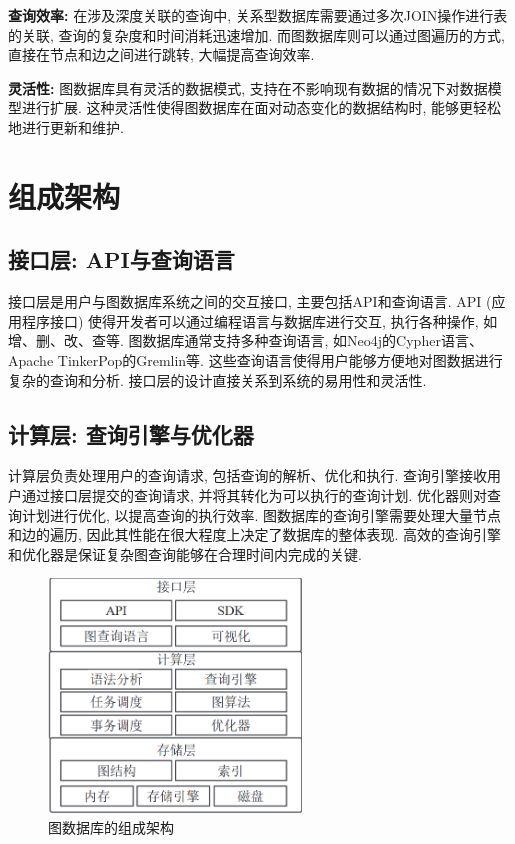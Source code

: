 \documentclass[12pt,hyperref,a4paper,UTF8]{ctexart}
\begin{document}
\textbf{查询效率:} 在涉及深度关联的查询中, 关系型数据库需要通过多次JOIN操作进行表的关联, 查询的复杂度和时间消耗迅速增加. 而图数据库则可以通过图遍历的方式, 直接在节点和边之间进行跳转, 大幅提高查询效率.

\textbf{灵活性:} 图数据库具有灵活的数据模式, 支持在不影响现有数据的情况下对数据模型进行扩展. 这种灵活性使得图数据库在面对动态变化的数据结构时, 能够更轻松地进行更新和维护.

\section{组成架构}

\subsection{接口层: API与查询语言}

接口层是用户与图数据库系统之间的交互接口, 主要包括API和查询语言. API (应用程序接口) 使得开发者可以通过编程语言与数据库进行交互, 执行各种操作, 如增、删、改、查等. 图数据库通常支持多种查询语言, 如Neo4j的Cypher语言、Apache TinkerPop的Gremlin等. 这些查询语言使得用户能够方便地对图数据进行复杂的查询和分析. 接口层的设计直接关系到系统的易用性和灵活性.

\subsection{计算层: 查询引擎与优化器}

计算层负责处理用户的查询请求, 包括查询的解析、优化和执行. 查询引擎接收用户通过接口层提交的查询请求, 并将其转化为可以执行的查询计划. 优化器则对查询计划进行优化, 以提高查询的执行效率. 图数据库的查询引擎需要处理大量节点和边的遍历, 因此其性能在很大程度上决定了数据库的整体表现. 高效的查询引擎和优化器是保证复杂图查询能够在合理时间内完成的关键.

\begin{figure}[H]
	\centering
	\includegraphics[width=0.6\textwidth]{images/3.png}
	\caption{图数据库的组成架构}
\end{figure}
\end{document}
